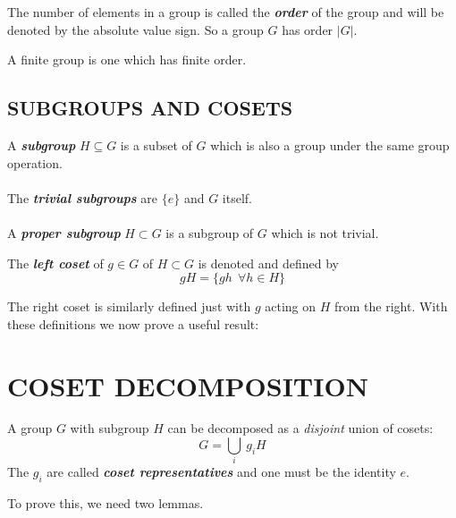 \documentclass[9 pt]{report}
\begin{document}
\begin{tcolorbox}
	The number of elements in a group is called the \textbf{\emph{order}} of the group and will be denoted by the absolute value sign. So a group $G$ has order $|G|$.
\end{tcolorbox}
A finite group is one which has finite order. 

{\centering 
	\subsection*{SUBGROUPS AND COSETS}}

\begin{tcolorbox}
	A \textbf{\emph{subgroup}} $H\subseteq G$ is a subset of $G$ which is also a group under the same group operation.
	\\
	\\
	The \textbf{\emph{trivial subgroups}} are $\{e\}$ and $G$ itself.
	\\
	\\
	A \textbf{\emph{proper subgroup}} $H\subset G$ is a subgroup of $G$ which is not trivial.
\end{tcolorbox}
\begin{tcolorbox}
	The \textbf{\emph{left coset}} of $g\in G$ of $H\subset G$ is denoted and defined by
	$$ gH = \{gh \:\:\forall h\in H\} $$
	
\end{tcolorbox}
The right coset is similarly defined just with $g$ acting on $H$ from the right. With these definitions we now prove a useful result:

{\centering
\section*{COSET DECOMPOSITION}}
\begin{tcolorbox}
	A group $G$ with subgroup $H$ can be decomposed as a \emph{disjoint} union of cosets:
	$$ G = \bigcup_i \:g_iH $$
	The $g_i$ are called \textbf{\emph{coset representatives}} and one must be the identity $e$.
\end{tcolorbox}

To prove this, we need two lemmas.
\end{document}

